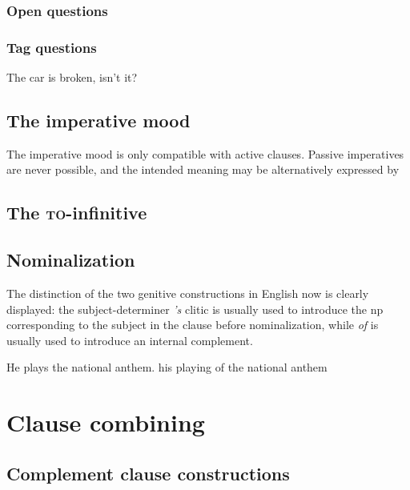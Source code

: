 \documentclass[UTF8, a4paper, oneside, scheme=plain, 12pt]{ctexbook}
\newcommand{\form}[1]{\emph{#1}}
\newcommand{\formcat}[1]{\textsc{#1}}
\begin{document}
\subsection{Open questions}

\subsection{Tag questions}

\begin{exe}
    \ex The car is broken, isn't it?
\end{exe}

\section{The imperative mood}

The imperative mood is only compatible with active clauses.
Passive imperatives are never possible, 
and the intended meaning may be alternatively expressed by 

\section{The \formcat{to}-infinitive}

\section{Nominalization}

The distinction of the two genitive constructions in English 
now is clearly displayed:
the subject-determiner \form{'s} clitic 
is usually used to introduce the \ac{np} corresponding to 
the subject in the clause before nominalization,
while \form{of} is usually used to introduce 
an internal complement.

\begin{exe}
    \ex \begin{xlist}
        \ex He plays the national anthem.
        \ex his playing of the national anthem
    \end{xlist}
\end{exe}

\chapter{Clause combining}\label{chap:clause-combining}

\section{Complement clause constructions}\label{sec:clause-combining.complement-clause}
\end{document}

